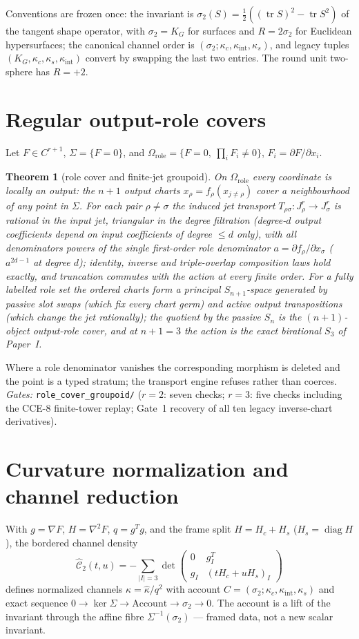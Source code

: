 \documentclass[11pt]{article}
\newtheorem{theorem}{Theorem}
\theoremstyle{definition}
\newcommand{\kc}{\kappa_c}
\newcommand{\ki}{\kappa_{\mathrm{int}}}
\newcommand{\ks}{\kappa_s}
\newcommand{\Sig}{\Sigma}
\newcommand{\Om}{\Omega_{\mathrm{role}}}
\begin{document}
Conventions are frozen once: the invariant is $\sigma_2(S)=\tfrac12((\operatorname{tr}
S)^2-\operatorname{tr}S^2)$ of the tangent shape operator, with $\sigma_2=K_G$ for
surfaces and $R=2\sigma_2$ for Euclidean hypersurfaces; the canonical channel order
is $(\sigma_2;\kc,\ki,\ks)$, and legacy tuples $(K_G,\kc,\ks,\ki)$ convert by
swapping the last two entries. The round unit two-sphere has $R=+2$.

\section{Regular output-role covers}
Let $F\in C^{r+1}$, $\Sig=\{F=0\}$, and
$\Om=\{F=0,\ \prod_i F_i\neq0\}$, $F_i=\partial F/\partial x_i$.

\begin{theorem}[role cover and finite-jet groupoid]\label{thm:A}
On $\Om$ every coordinate is locally an output: the $n{+}1$ output charts
$x_\rho=f_\rho(x_{j\neq\rho})$ cover a neighbourhood of any point in $\Sig$. For
each pair $\rho\neq\sigma$ the induced jet transport
$T_{\rho\sigma}:J^r_\rho\to J^r_\sigma$ is rational in the input jet, triangular in
the degree filtration (degree-$d$ output coefficients depend on input coefficients
of degree $\le d$ only), with all denominators powers of the single first-order
role denominator $a=\partial f_\rho/\partial x_\sigma$ ($a^{2d-1}$ at degree $d$);
identity, inverse and triple-overlap composition laws hold exactly, and truncation
commutes with the action at every finite order. For a fully labelled role set the
ordered charts form a principal $S_{n+1}$-space generated by passive slot swaps
(which fix every chart germ) and active output transpositions (which change the jet
rationally); the quotient by the passive $S_n$ is the $(n{+}1)$-object output-role
cover, and at $n{+}1=3$ the action is the exact birational $S_3$ of Paper~I.
\end{theorem}

Where a role denominator vanishes the corresponding morphism is deleted and the
point is a typed stratum; the transport engine refuses rather than coerces.
\emph{Gates:} \texttt{role\_cover\_groupoid/} ($r=2$: seven checks; $r=3$: five
checks including the CCE-8 finite-tower replay; Gate~1 recovery of all ten legacy
inverse-chart derivatives).

\section{Curvature normalization and channel reduction}
With $g=\nabla F$, $H=\nabla^2F$, $q=g^Tg$, and the frame split $H=H_c+H_s$
($H_s=\operatorname{diag}H$), the bordered channel density
\[
\widehat{\mathcal C}_2(t,u)=-\!\!\sum_{|I|=3}\det\begin{pmatrix}0&g_I^T\\
g_I&(tH_c+uH_s)_I\end{pmatrix}
\]
defines normalized channels $\kappa=\widehat\kappa/q^2$ with account
$C=(\sigma_2;\kc,\ki,\ks)$ and exact sequence
$0\to\ker\Sigma\to\text{Account}\to\sigma_2\to0$. The account is a lift of the
invariant through the affine fibre $\Sigma^{-1}(\sigma_2)$ --- framed data, not a
new scalar invariant.
\end{document}
